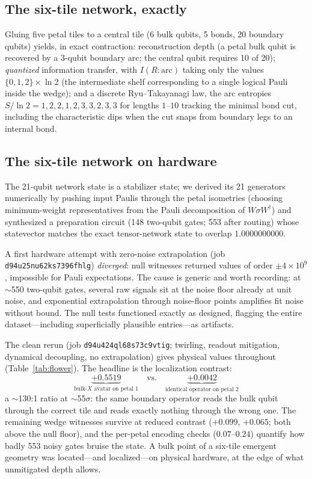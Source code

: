 \documentclass[11pt]{article}
\begin{document}
\subsection{The six-tile network, exactly}

Gluing five petal tiles to a central tile (6 bulk qubits, 5 bonds, 20
boundary qubits) yields, in exact contraction: reconstruction depth
(a petal bulk qubit is recovered by a 3-qubit boundary arc; the central
qubit requires 10 of 20); \emph{quantized} information transfer, with
$I(R{:}\text{arc})$ taking only the values $\{0, 1, 2\} \times \ln 2$
(the intermediate shelf corresponding to a single logical Pauli inside
the wedge); and a discrete Ryu--Takayanagi law, the arc entropies
$S/\ln 2 = 1,2,2,1,2,3,3,2,3,3$ for lengths $1$--$10$ tracking the
minimal bond cut, including the characteristic dips when the cut snaps
from boundary legs to an internal bond.

\subsection{The six-tile network on hardware}

The 21-qubit network state is a stabilizer state; we derived its 21
generators numerically by pushing input Paulis through the petal
isometries (choosing minimum-weight representatives from the Pauli
decomposition of $W\sigma W^\dagger$) and synthesized a preparation
circuit (148 two-qubit gates; 553 after routing) whose statevector
matches the exact tensor-network state to overlap $1.0000000000$.

A first hardware attempt with zero-noise extrapolation (job
\texttt{d94u25nu62ks7396fhlg}) \emph{diverged}: null witnesses returned
values of order $\pm 4\times10^{9}$, impossible for Pauli expectations.
The cause is generic and worth recording: at $\sim$550 two-qubit gates,
several raw signals sit at the noise floor already at unit noise, and
exponential extrapolation through noise-floor points amplifies fit
noise without bound. The null tests functioned exactly as designed,
flagging the entire dataset---including superficially plausible
entries---as artifacts.

The clean rerun (job \texttt{d94u424ql68s73c9vtig}; twirling, readout
mitigation, dynamical decoupling, no extrapolation) gives physical
values throughout (Table~\ref{tab:flower}). The headline is the
localization contrast:
\begin{equation}
\underbrace{+0.5519}_{\text{bulk-}X\text{ avatar on petal 1}}
\quad\text{vs.}\quad
\underbrace{+0.0042}_{\text{identical operator on petal 2}}
\end{equation}
a $\sim$130:1 ratio at $\sim$55$\sigma$: the same boundary operator
reads the bulk qubit through the correct tile and reads exactly nothing
through the wrong one. The remaining wedge witnesses survive at reduced
contrast ($+0.099$, $+0.065$; both above the null floor), and the
per-petal encoding checks ($0.07$--$0.24$) quantify how badly 553 noisy
gates bruise the state. A bulk point of a six-tile emergent geometry
was located---and localized---on physical hardware, at the edge of what
unmitigated depth allows.
\end{document}
